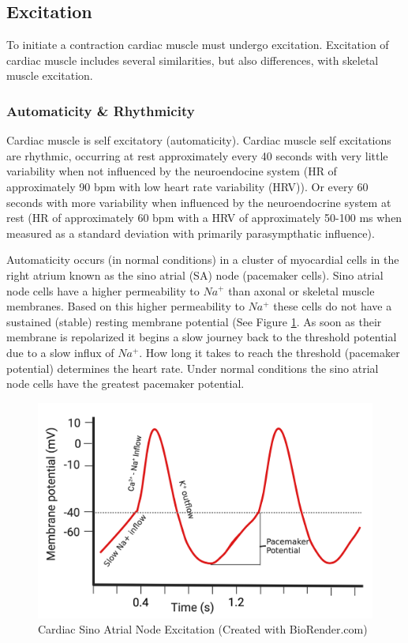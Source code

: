 \subsection{Excitation}

To initiate a contraction cardiac muscle must undergo excitation. Excitation of cardiac muscle includes several similarities, but also differences, with skeletal muscle excitation. 

\subsubsection{Automaticity \& Rhythmicity}

Cardiac muscle is self excitatory (automaticity). Cardiac muscle self excitations are rhythmic, occurring at rest approximately every 40 seconds with very little variability when not influenced by the neuroendocine system (HR of approximately 90 bpm with low heart rate variability (HRV)). Or every 60 seconds with more variability when influenced by the neuroendocrine system at rest (HR of approximately 60 bpm with a HRV of approximately 50-100 ms when measured as a standard deviation with primarily parasympthatic influence).

Automaticity occurs (in normal conditions) in a cluster of myocardial cells in the right atrium known as the sino atrial (SA) node (pacemaker cells). Sino atrial node cells have a higher permeability to $Na^+$ than axonal or skeletal muscle membranes. Based on this higher permeability to $Na^+$ these cells do not have a sustained (stable) resting membrane potential (See Figure \ref{fig:Cardiac_SA_Node_AP}. As soon as their membrane is repolarized it begins a slow journey back to the threshold potential due to a slow influx of $Na^+$. How long it takes to reach the threshold (pacemaker potential) determines the heart rate. Under normal conditions the sino atrial node cells have the greatest pacemaker potential.

\begin{figure}[!h]
    \centering
    \includegraphics[width=0.5\linewidth]{./figure/Cardiac_SA_Node_AP.png}
    \caption{Cardiac Sino Atrial Node Excitation \footnotesize{(Created with BioRender.com)}}
    \label{fig:Cardiac_SA_Node_AP}
\end{figure}

